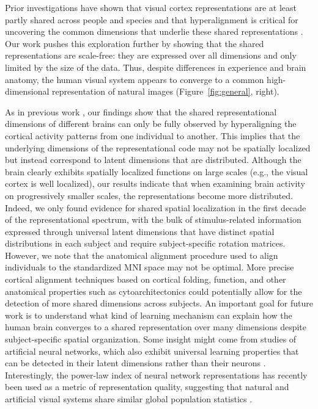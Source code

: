 \documentclass[10pt]{article}
\begin{document}
Prior investigations have shown that visual cortex representations are at least partly shared across people and species \autocite{Haxby2011,Kriegeskorte2008} and that hyperalignment is critical for uncovering the common dimensions that underlie these shared representations \autocite{Haxby2011,Haxby2020}. Our work pushes this exploration further by showing that the shared representations are scale-free: they are expressed over all dimensions and only limited by the size of the data. Thus, despite differences in experience and brain anatomy, the human visual system appears to converge to a common high-dimensional representation of natural images (Figure~\ref{fig:general}, right).

As in previous work \autocite{Haxby2011}, our findings show that the shared representational dimensions of different brains can only be fully observed by hyperaligning the cortical activity patterns from one individual to another. This implies that the underlying dimensions of the representational code may not be spatially localized but instead correspond to latent dimensions that are distributed. Although the brain clearly exhibits spatially localized functions on large scales (e.g., the visual cortex is well localized), our results indicate that when examining brain activity on progressively smaller scales, the representations become more distributed. Indeed, we only found evidence for shared spatial localization in the first decade of the representational spectrum, with the bulk of stimulus-related information expressed through universal latent dimensions that have distinct spatial distributions in each subject and require subject-specific rotation matrices. However, we note that the anatomical alignment procedure used to align individuals to the standardized MNI space may not be optimal. More precise cortical alignment techniques based on cortical folding, function, and other anatomical properties such as cytoarchitectonics could potentially allow for the detection of more shared dimensions across subjects. An important goal for future work is to understand what kind of learning mechanism can explain how the human brain converges to a shared representation over many dimensions despite subject-specific spatial organization. Some insight might come from studies of artificial neural networks, which also exhibit universal learning properties that can be detected in their latent dimensions rather than their neurons \autocites[e.g.][]{Guth2024,Chen2024}. Interestingly, the power-law index of neural network representations has recently been used as a metric of representation quality, suggesting that natural and artificial visual systems share similar global population statistics \autocite{Agrawal2022}.
\end{document}
